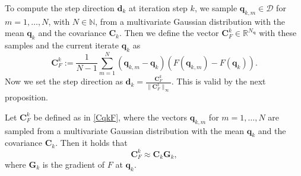 To compute the step direction $\mathbf{d}_k$ at iteration step $k$, we sample $\mathbf{q}_{k,m}\in\mathcal{D}$ for $m=1,\dotsc,N$, with $N\in\mathbb{N}$, from a multivariate Gaussian distribution with the mean $\mathbf{q}_k$ and the covariance $\mathbf{C}_k$. Then we define the vector $\mathbf{C}_F^k\in\mathbb{R}^{N_\mathbf{q}}$ with these samples and the current iterate $\mathbf{q}_k$ as
\begin{equation}
\label{CqkF}
\mathbf{C}_F^k:=\frac{1}{N-1}\sum_{m=1}^N(\mathbf{q}_{k,m}-\mathbf{q}_k)(F(\mathbf{q}_{k,m})-F(\mathbf{q}_k)).
\end{equation}
Now we set the step direction as $\mathbf{d}_k=\frac{\mathbf{C}_F^k}{\|\mathbf{C}_F^k\|_\infty}$. This is valid by the next proposition.

\begin{prop}
\label{propCovMat}
Let $\mathbf{C}_F^k$ be defined as in \eqref{CqkF}, where the vectors $\mathbf{q}_{k,m}$ for $m=1,\dotsc,N$ are sampled from a multivariate Gaussian distribution with the mean $\mathbf{q}_k$ and the covariance $\mathbf{C}_k$. Then it holds that
\begin{equation*}
\mathbf{C}_F^k\approx\mathbf{C}_k\mathbf{G}_k,
\end{equation*}
where $\mathbf{G}_k$ is the gradient of $F$ at $\mathbf{q}_k$.
\end{prop}
